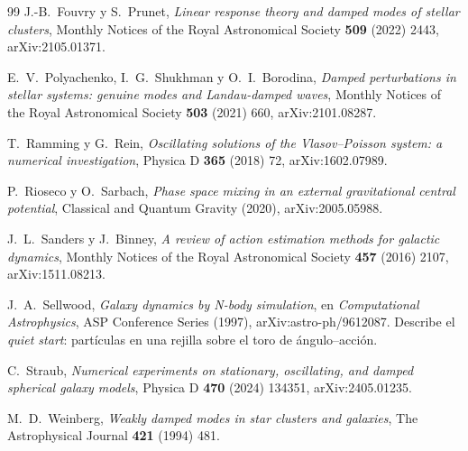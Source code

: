 \documentclass[11pt,a4paper]{article}
\theoremstyle{definition}
\begin{document}
\begin{thebibliography}{99}
J.-B.~Fouvry y S.~Prunet,
\emph{Linear response theory and damped modes of stellar clusters},
Monthly Notices of the Royal Astronomical Society \textbf{509} (2022) 2443,
arXiv:2105.01371.

E.~V.~Polyachenko, I.~G.~Shukhman y O.~I.~Borodina,
\emph{Damped perturbations in stellar systems: genuine modes and Landau-damped waves},
Monthly Notices of the Royal Astronomical Society \textbf{503} (2021) 660,
arXiv:2101.08287.

T.~Ramming y G.~Rein,
\emph{Oscillating solutions of the Vlasov--Poisson system: a numerical investigation},
Physica D \textbf{365} (2018) 72, arXiv:1602.07989.

P.~Rioseco y O.~Sarbach,
\emph{Phase space mixing in an external gravitational central potential},
Classical and Quantum Gravity (2020), arXiv:2005.05988.

J.~L.~Sanders y J.~Binney,
\emph{A review of action estimation methods for galactic dynamics},
Monthly Notices of the Royal Astronomical Society \textbf{457} (2016) 2107,
arXiv:1511.08213.

J.~A.~Sellwood,
\emph{Galaxy dynamics by N-body simulation},
en \emph{Computational Astrophysics}, ASP Conference Series (1997),
arXiv:astro-ph/9612087.
\newblock Describe el \emph{quiet start}: partículas en una rejilla sobre el toro de
ángulo--acción.

C.~Straub,
\emph{Numerical experiments on stationary, oscillating, and damped spherical galaxy
models},
Physica D \textbf{470} (2024) 134351, arXiv:2405.01235.

M.~D.~Weinberg,
\emph{Weakly damped modes in star clusters and galaxies},
The Astrophysical Journal \textbf{421} (1994) 481.

\end{thebibliography}
\end{document}
